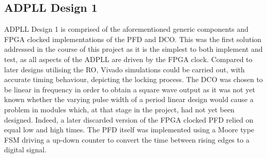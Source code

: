 \subsection{\acs{ADPLL} Design 1}
\acs{ADPLL} Design 1 is comprised of the aforementioned generic components and \ac{FPGA} clocked implementations of the \ac{PFD} and \ac{DCO}. This was the first solution addressed in the course of this project as it is the simplest to both implement and test, as all aspects of the \ac{ADPLL} are driven by the \ac{FPGA} clock. Compared to later designs utilising the \ac{RO}, Vivado simulations could be carried out, with accurate timing behaviour, depicting the locking process. The \ac{DCO} was chosen to be linear in frequency in order to obtain a square wave output as it was not yet known whether the varying pulse width of a period linear design would cause a problem in modules which, at that stage in the project, had not yet been designed. Indeed, a later discarded version of the \ac{FPGA} clocked \ac{PFD} relied on equal low and high times. The \ac{PFD} itself was implemented using a Moore type \ac{FSM} driving a up-down counter to convert the time between rising edges to a digital signal.

